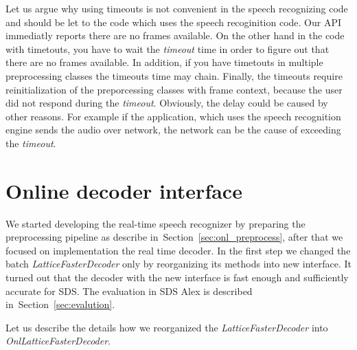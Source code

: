 Let us argue why using timeouts is not convenient in the speech recognizing code
and should be let to the code which uses the speech recoginition code.
Our \ac{API} immediatly reports there are no frames available.
On the other hand in the code with timetouts, you have to wait the {\it timeout}\/ time
in order to figure out that there are no frames available.
In addition, if you have timetouts in multiple preprocessing classes the timeouts time may chain.
Finally, the timeouts require reinitialization of the preporcessing classes with frame context,
because the user did not respond during the {\it timeout}\/. 
Obviously, the delay could be caused by other reasons. For example if the application, 
which uses the speech recognition engine sends the audio over network, the network can be
the cause of exceeding the {\it timeout}\/.

\section{Online decoder interface} 
\label{sec:improve}
We started developing the real-time speech recognizer by preparing the preprocessing
pipeline as describe in~Section~\ref{sec:onl_preprocess}, after that we focused 
on implementation the real time decoder. In the first step we changed 
the batch {\it LatticeFasterDecoder}\/ only by reorganizing its methods into new interface.
It turned out that the decoder with the new interface is 
fast enough and sufficiently accurate for \ac{SDS}. 
The evaluation in \ac{SDS} Alex is described in~Section~\ref{sec:evalution}.

Let us describe the details how we reorganized the {\it LatticeFasterDecoder}\/ 
into {\it OnlLatticeFasterDecoder}.

